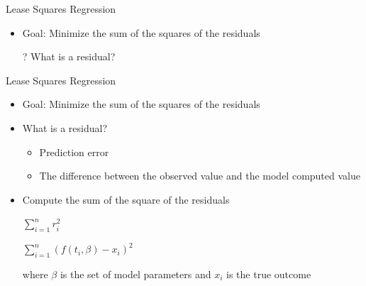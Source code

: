 \documentclass[aspectratio=169]{beamer}
\begin{document}
\begin{frame}{Lease Squares Regression}

\begin{itemize}
\item Goal: Minimize the sum of the squares of the residuals
\item[?] What is a residual?
\end{itemize}
\end{frame}
\begin{frame}{Lease Squares Regression}

\begin{itemize}
\item Goal: Minimize the sum of the squares of the residuals
\item What is a residual?
\begin{itemize}
\item Prediction error
\item The difference between the observed value and the model computed value

\end{itemize}
\item Compute the sum of the square of the residuals
\item [] $\sum_{i=1}^n r_i^2$
\item [] $\sum_{i=1}^n (f(t_i, \beta) - x_i)^2$ %
\item[] where $\beta$ is the set of model parameters and $x_i$ is the true outcome 
\end{itemize}
\end{frame}
\end{document}
